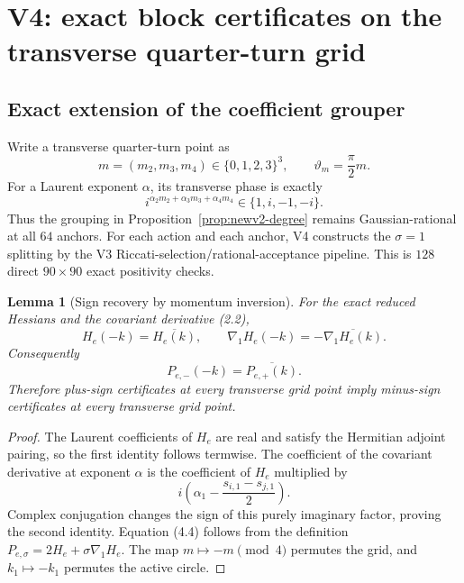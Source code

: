 \documentclass[11pt,oneside]{article}
\newtheorem{lemma}[theorem]{Lemma}
\theoremstyle{definition}
\theoremstyle{remark}
\begin{document}
\section{V4: exact block certificates on the transverse quarter-turn grid}
\label{sec:newv4-grid}

\subsection{Exact extension of the coefficient grouper}

Write a transverse quarter-turn point as
\[
 m=(m_2,m_3,m_4)\in\{0,1,2,3\}^3,\qquad
 \vartheta_m=\frac{\pi}{2}m.                              \tag{4.1}
\]
For a Laurent exponent \(\alpha\), its transverse phase is exactly
\[
 i^{\alpha_2m_2+\alpha_3m_3+\alpha_4m_4}\in\{1,i,-1,-i\}. \tag{4.2}
\]
Thus the grouping in Proposition~\ref{prop:newv2-degree} remains
Gaussian-rational at all \(64\) anchors.  For each action and each
anchor, V4 constructs the \(\sigma=1\) splitting by the V3
Riccati-selection/rational-acceptance pipeline.  This is \(128\)
direct \(90\times90\) exact positivity checks.

\begin{lemma}[Sign recovery by momentum inversion]
\label{lem:newv4-inversion}
For the exact reduced Hessians and the covariant derivative (2.2),
\[
 H_e(-k)=\overline{H_e(k)},\qquad
 \nabla_1H_e(-k)=-\overline{\nabla_1H_e(k)}.              \tag{4.3}
\]
Consequently
\[
 P_{e,-}(-k)=\overline{P_{e,+}(k)}.                       \tag{4.4}
\]
Therefore plus-sign certificates at every transverse grid point
imply minus-sign certificates at every transverse grid point.
\end{lemma}

\begin{proof}
The Laurent coefficients of \(H_e\) are real and satisfy the
Hermitian adjoint pairing, so the first identity follows termwise.
The coefficient of the covariant derivative at exponent \(\alpha\)
is the coefficient of \(H_e\) multiplied by
\[
 i\left(\alpha_1-\frac{s_{i,1}-s_{j,1}}2\right).
\]
Complex conjugation changes the sign of this purely imaginary
factor, proving the second identity.  Equation (4.4) follows from
the definition \(P_{e,\sigma}=2H_e+\sigma\nabla_1H_e\).
The map \(m\mapsto-m\pmod4\) permutes the grid, and
\(k_1\mapsto-k_1\) permutes the active circle.
\end{proof}
\end{document}
